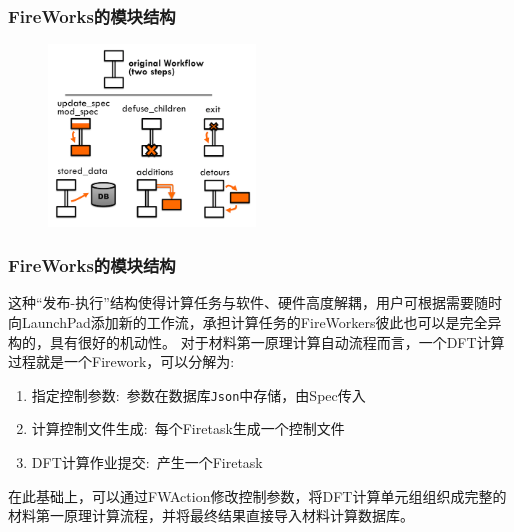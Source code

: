 \frame
{
	\frametitle{\textrm{FireWorks}的模块结构}
\fontsize{8.2pt}{6.2pt}
\begin{figure}[h!]
\centering
\vspace*{-0.10in}
\includegraphics[height=1.9in]{Figures/MP_Fireworks_fwactions.png}
\caption{\fontsize{7.2pt}{4.2pt}}%
\label{FireWorks_FWA}
\end{figure} 
}

\frame
{
	\frametitle{\textrm{FireWorks}的模块结构}
这种“发布-执行”结构使得计算任务与软件、硬件高度解耦，用户可根据需要随时向\textrm{LaunchPad}添加新的工作流，承担计算任务的\textrm{FireWorkers}彼此也可以是完全异构的，具有很好的机动性。
\vskip 0.25in
对于材料第一原理计算自动流程而言，一个\textrm{DFT}计算过程就是一个\textrm{Firework}，可以分解为:
\begin{enumerate}
	\item 指定控制参数:~参数在数据库\texttt{Json}中存储，由\textrm{Spec}传入
	\item 计算控制文件生成:~每个\textrm{Firetask}生成一个控制文件
	\item \textrm{DFT}计算作业提交:~产生一个\textrm{Firetask}
\end{enumerate}
在此基础上，可以通过\textrm{FWAction}修改控制参数，将\textrm{DFT}计算单元组组织成完整的材料第一原理计算流程，并将最终结果直接导入材料计算数据库。
}

